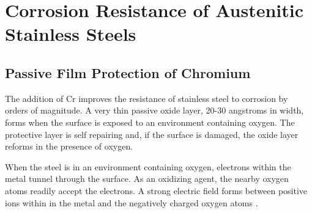 



\FloatBarrier







\section[Corrosion Resistance]{Corrosion Resistance of Austenitic Stainless Steels}

\subsection{Passive Film Protection of Chromium}

The addition of Cr improves the resistance of stainless steel to corrosion by orders of magnitude.  A very thin passive oxide layer, 20-30 angstroms in width, forms when the surface is exposed to an environment containing oxygen.  The protective layer is self repairing and, if the surface is damaged, the oxide layer reforms in the presence of oxygen.

When the steel is in an environment containing oxygen, electrons within the metal tunnel through the surface.  As an oxidizing agent, the nearby oxygen atoms readily accept the electrons.  A strong electric field forms between positive ions within in the metal and the negatively charged oxygen atoms \cite{medicalmetals133}.  

